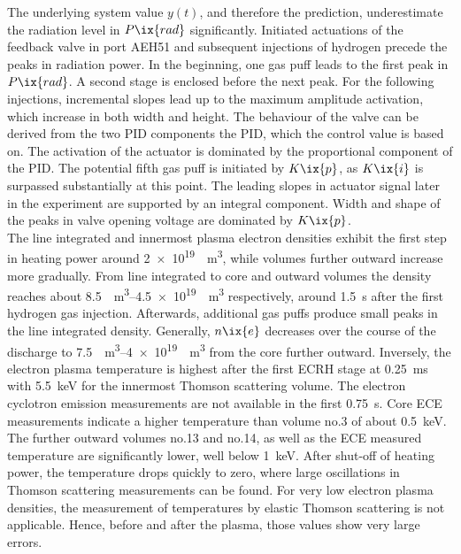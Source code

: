             The underlying system value $y\left(t\right)$, and therefore the prediction, underestimate the radiation level in $P\ix{rad}$ significantly. Initiated actuations of the feedback valve in port AEH51 and subsequent injections of hydrogen precede the peaks in radiation power. In the beginning, one gas puff leads to the first peak in $P\ix{rad}$. A second stage is enclosed before the next peak. For the following injections, incremental slopes lead up to the maximum amplitude activation, which increase in both width and height. The behaviour of the valve can be derived from the two PID components the PID, which the control value is based on. The activation of the actuator is dominated by the proportional component of the PID. The potential fifth gas puff is initiated by $K\ix{p}$, as $K\ix{i}$ is surpassed substantially at this point. The leading slopes in actuator signal later in the experiment are supported by an integral component. Width and shape of the peaks in valve opening voltage are dominated by $K\ix{p}$.\\%
            The line integrated and innermost plasma electron densities exhibit the first step in heating power around \SI[per-mode=reciprocal]{2e19}{\per\cubic\meter}, while volumes further outward increase more gradually. From line integrated to core and outward volumes the density reaches about \SIrange[per-mode=reciprocal]{8.5}{4.5e19}{\per\cubic\meter} respectively, around \SI{1.5}{\second} after the first hydrogen gas injection. Afterwards, additional gas puffs produce small peaks in the line integrated density. Generally, $n\ix{e}$ decreases over the course of the discharge to \SIrange[per-mode=reciprocal]{7.5}{4e19}{\per\cubic\meter} from the core further outward. Inversely, the electron plasma temperature is highest after the first ECRH stage at \SI{0.25}{\milli\second} with \SI{5.5}{\kilo\electronvolt} for the innermost Thomson scattering volume. The electron cyclotron emission measurements are not available in the first \SI{0.75}{\second}. Core ECE measurements indicate a higher temperature than volume no.3 of about \SI{0.5}{\kilo\electronvolt}. The further outward volumes no.13 and no.14, as well as the ECE measured temperature are significantly lower, well below \SI{1}{\kilo\electronvolt}. After shut-off of heating power, the temperature drops quickly to zero, where large oscillations in Thomson scattering measurements can be found. For very low electron plasma densities, the measurement of temperatures by elastic Thomson scattering is not applicable. Hence, before and after the plasma, those values show very large errors.\\%
